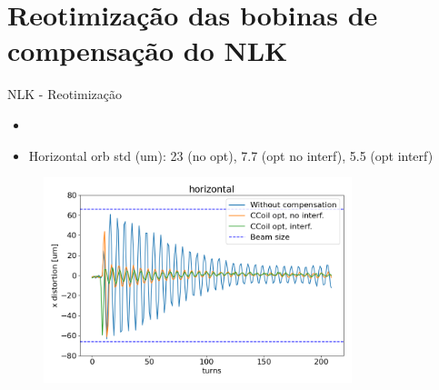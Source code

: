 \documentclass[aspectratio=169]{beamer}					  %
\begin{document}
\section{Reotimização das bobinas de compensação do NLK}

\begin{frame}{NLK - Reotimização}
    \scriptsize{\begin{itemize}
    		\item \href{https://ais-eng-srv-ta.cnpem.br/Olog/\#20923_4}{}
            \item Horizontal orb std (um): 23 (no opt), 7.7 (opt no interf),  5.5 (opt interf)
    \end{itemize}}
    \begin{figure}[H]
        	\centering
            \includegraphics[width=0.8\textwidth]{2023-12-12/figures/horizontal_nlk_distortion_interference.png}
            \label{fig:bba}
    \end{figure} 
\end{frame}
\end{document}
